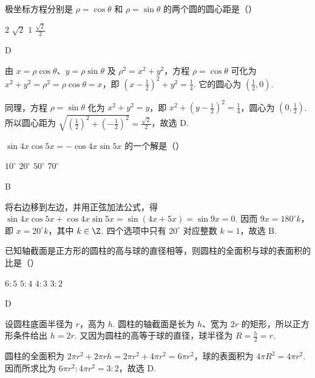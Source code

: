 \documentclass[UTF8,a4paper,oneside,11pt]{ctexbook}
\begin{document}
\begin{problem}
极坐标方程分别是 \(\rho=\cos\theta\) 和 \(\rho=\sin\theta\) 的两个圆的圆心距是（\quad）

\choices
    {\(2\)}
    {\(\sqrt{2}\)}
    {\(1\)}
    {\(\frac{\sqrt{2}}{2}\)}

\begin{answer}
D
\end{answer}

\begin{solution}
由 \(x=\rho\cos\theta\)、\(y=\rho\sin\theta\) 及 \(\rho^2=x^2+y^2\)，方程 \(\rho=\cos\theta\) 可化为
\(x^2+y^2=\rho^2=\rho\cos\theta=x\)，即
\(\left(x-\frac{1}{2}\right)^2+y^2=\frac{1}{4}\). 它的圆心为 \(\left(\frac{1}{2},0\right)\).

同理，方程 \(\rho=\sin\theta\) 化为 \(x^2+y^2=y\)，即
\(x^2+\left(y-\frac{1}{2}\right)^2=\frac{1}{4}\)，圆心为 \(\left(0,\frac{1}{2}\right)\). 所以圆心距为
\(\sqrt{\left(\frac{1}{2}\right)^2+\left(-\frac{1}{2}\right)^2}=\frac{\sqrt{2}}{2}\)，故选 D.
\end{solution}
\end{problem}

\begin{problem}
\(\sin 4x\cos 5x=-\cos 4x\sin 5x\) 的一个解是（\quad）

\choices
    {\(10^{\circ}\)}
    {\(20^{\circ}\)}
    {\(50^{\circ}\)}
    {\(70^{\circ}\)}

\begin{answer}
B
\end{answer}

\begin{solution}
将右边移到左边，并用正弦加法公式，得
\(\sin4x\cos5x+\cos4x\sin5x=\sin(4x+5x)=\sin9x=0\). 因而 \(9x=180^{\circ}k\)，即 \(x=20^{\circ}k\)，其中 \(k\in\Z\). 四个选项中只有 \(20^{\circ}\) 对应整数 \(k=1\)，故选 B.
\end{solution}
\end{problem}

\begin{problem}
已知轴截面是正方形的圆柱的高与球的直径相等，则圆柱的全面积与球的表面积的比是（\quad）

\choices
    {\(6:5\)}
    {\(5:4\)}
    {\(4:3\)}
    {\(3:2\)}

\begin{answer}
D
\end{answer}

\begin{solution}
设圆柱底面半径为 \(r\)，高为 \(h\). 圆柱的轴截面是长为 \(h\)、宽为 \(2r\) 的矩形，所以正方形条件给出 \(h=2r\). 又因为圆柱的高等于球的直径，球半径为 \(R=\frac h2=r\).

圆柱的全面积为 \(2\pi r^2+2\pi rh=2\pi r^2+4\pi r^2=6\pi r^2\)，球的表面积为 \(4\pi R^2=4\pi r^2\). 因而所求比为 \(6\pi r^2:4\pi r^2=3:2\)，故选 D.
\end{solution}
\end{problem}
\end{document}
